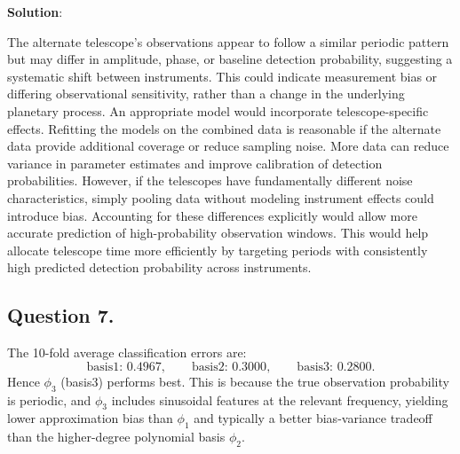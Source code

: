 \documentclass[submit]{../harvardml}
\newenvironment{solution}{
    \vspace{2mm}
    \color{blue}\noindent\textbf{Solution}:
}{}
\begin{document}
\begin{solution}
The alternate telescope’s observations appear to follow a similar periodic pattern but may differ in amplitude, phase, or baseline detection probability, suggesting a systematic shift between instruments. This could indicate measurement bias or differing observational sensitivity, rather than a change in the underlying planetary process. An appropriate model would incorporate telescope-specific effects. Refitting the models on the combined data is reasonable if the alternate data provide additional coverage or reduce sampling noise. More data can reduce variance in parameter estimates and improve calibration of detection probabilities. However, if the telescopes have fundamentally different noise characteristics, simply pooling data without modeling instrument effects could introduce bias. Accounting for these differences explicitly would allow more accurate prediction of high-probability observation windows. This would help allocate telescope time more efficiently by targeting periods with consistently high predicted detection probability across instruments.

\subsection{Question 7.}

The 10-fold average classification errors are:
\[
\text{basis1: }0.4967,\qquad \text{basis2: }0.3000,\qquad \text{basis3: }0.2800.
\]
Hence \(\phi_3\) (basis3) performs best. This is because the true observation probability is periodic, and \(\phi_3\) includes sinusoidal features at the relevant frequency, yielding lower approximation bias than \(\phi_1\) and typically a better bias-variance tradeoff than the higher-degree polynomial basis \(\phi_2\).

\end{solution}


\newpage
\end{document}
